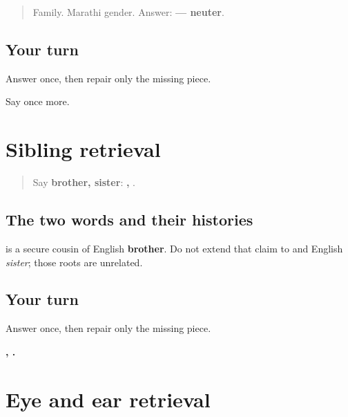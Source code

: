 \label{lesson:MR-R14-kutumb-r2}



\begin{quote}
Family. Marathi gender. Answer: \textbf{ — neuter}.
\end{quote}

\subsection*{Your turn}
Answer once, then repair only the missing piece.

\begin{tcolorbox}[breakable,colback=teal!4,colframe=teal!35!black,title={Before you move on}]
Say \textbf{} once more.
\end{tcolorbox}
\section[\texorpdfstring{\mr{भाऊ} / \mr{बहीण} (bhau / bahin)}{भाऊ / बहीण (bhau / bahin)}]{Sibling retrieval}

\label{lesson:MR-R14-siblings}



\begin{quote}
Say \textbf{brother, sister}: \textbf{, }.
\end{quote}

\subsection*{The two words and their histories}
\textbf{} is a secure cousin of English \textbf{brother}. Do not extend that claim to \textbf{} and English \emph{sister}; those roots are unrelated.

\subsection*{Your turn}
Answer once, then repair only the missing piece.

\begin{tcolorbox}[breakable,colback=teal!4,colframe=teal!35!black,title={Before you move on}]
\textbf{, .}
\end{tcolorbox}
\section[\texorpdfstring{\mr{डोळा} / \mr{कान} (dola / kaan)}{डोळा / कान (dola / kaan)}]{Eye and ear retrieval}

